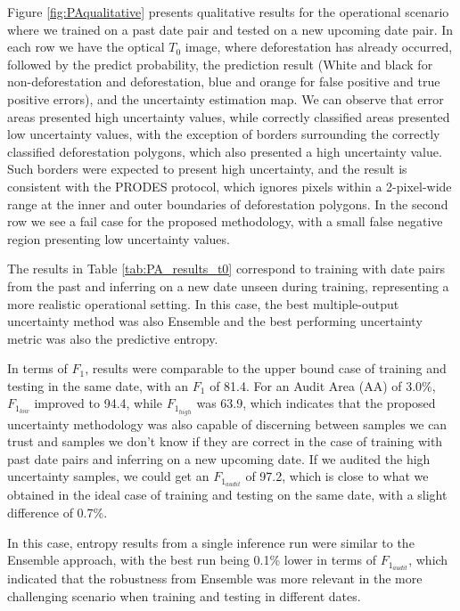 Figure \ref{fig:PAqualitative} presents qualitative results for the operational scenario where we trained on a past date pair and tested on a new upcoming date pair. In each row we have the optical $T_0$ image, where deforestation has already occurred, followed by the predict probability, the prediction result (White and black for non-deforestation and deforestation, blue and orange for false positive and true positive errors), and the uncertainty estimation map. We can observe that error areas presented high uncertainty values, while correctly classified areas presented low uncertainty values, with the exception of borders surrounding the correctly classified deforestation polygons, which also presented a high uncertainty value. Such borders were expected to present high uncertainty, and the result is consistent with the PRODES protocol, which ignores pixels within a 2-pixel-wide range at the inner and outer boundaries of deforestation polygons. In the second row we see a fail case for the proposed methodology, with a small false negative region presenting low uncertainty values.

The results in Table \ref{tab:PA_results_t0} correspond to training with date pairs from the past and inferring on a new date unseen during training, representing a more realistic operational setting. In this case, the best multiple-output uncertainty method was also Ensemble and the best performing uncertainty metric was also the predictive entropy.

In terms of $F_1$, results were comparable to the upper bound case of training and testing in the same date, with an $F_1$ of 81.4. For an Audit Area (AA) of 3.0\%, $F_{1_{low}}$ improved to 94.4, while $F_{1_{high}}$ was 63.9, which indicates that the proposed uncertainty methodology was also capable of discerning between samples we can trust and samples we don't know if they are correct in the case of training with past date pairs and inferring on a new upcoming date. If we audited the high uncertainty samples, we could get an $F_{1_{audit}}$ of 97.2, which is close to what we obtained in the ideal case of training and testing on the same date, with a slight difference of 0.7\%. 

In this case, entropy results from a single inference run were similar to the Ensemble approach, with the best run being 0.1\% lower in terms of $F_{1_{audit}}$, which indicated that the robustness from Ensemble was more relevant in the more challenging scenario when training and testing in different dates.


